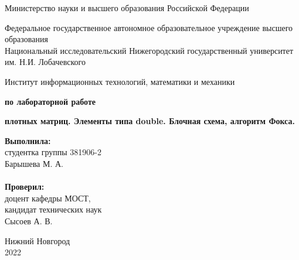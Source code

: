 \documentclass[12pt]{article}
\begin{document}
\begin{titlepage}

\begin{center}
Министерство науки и высшего образования Российской Федерации
\end{center}

\begin{center}
Федеральное государственное автономное образовательное учреждение высшего образования \\
Национальный исследовательский Нижегородский государственный университет им. Н.И. Лобачевского
\end{center}

\begin{center}
Институт информационных технологий, математики и механики
\end{center}

\vspace{4em}

\begin{center}
\textbf{ по лабораторной работе} \\
\end{center}
\begin{center}
\textbf{ плотных матриц. Элементы типа double. Блочная схема, алгоритм Фокса.} \\
\end{center}

\vspace{4em}

\newbox{\lbox}
\newlength{\maxl}
\setlength{\maxl}{\wd\lbox}
\hfill\parbox{7cm}{
\hspace*{5cm}\hspace*{-5cm}\textbf{Выполнила:} \\ студентка группы 381906-2 \\ Барышева М. А. \\
\\
\hspace*{5cm}\hspace*{-5cm}\textbf{Проверил:}\\ доцент кафедры МОСТ, \\ кандидат технических наук \\ Сысоев А. В.\\
}
\vspace{\fill}

\begin{center} Нижний Новгород \\ 2022 \end{center}

\end{titlepage}
\end{document}
